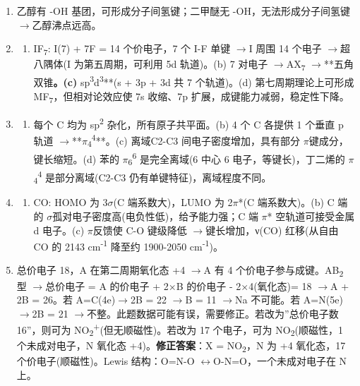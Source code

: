 \documentclass[a4paper,11pt]{ctexart}
\providecommand{\tightlist}{\setlength{\itemsep}{0pt}\setlength{\parskip}{0pt}}
\newcommand{\箭}{\ensuremath{\rightarrow}}
\newcommand{\左箭}{\ensuremath{\leftarrow}}
\newcommand{\上箭}{\ensuremath{\uparrow}}
\newcommand{\下箭}{\ensuremath{\downarrow}}
\newcommand{\衡}{\ensuremath{\rightleftharpoons}}
\newcommand{\双箭}{\ensuremath{\leftrightarrow}}
\newcommand{\约等于}{\ensuremath{\approx}}
\newcommand{\小于等于}{\ensuremath{\leq}}
\newcommand{\大于等于}{\ensuremath{\geq}}
\newcommand{\不等于}{\ensuremath{\neq}}
\newcommand{\西格马}{\ensuremath{\sigma}}
\newcommand{\派}{\ensuremath{\pi}}
\begin{document}
\begin{enumerate}
\begin{enumerate}
  \def\labelenumii{(\alph{enumii})}
  \tightlist
  \item
    HF 有氢键，HCl 无氢键 \箭 HF 沸点反常高。(b) 冰中每个水分子通过氢键与 4 个相邻水分子形成四面体排列，体积膨胀 \箭 密度小于液态水。
  \end{enumerate}
\item
  乙醇有 -OH 基团，可形成分子间氢键；二甲醚无 -OH，无法形成分子间氢键 \箭 乙醇沸点远高。
\item
  \begin{enumerate}
  \def\labelenumii{(\alph{enumii})}
  \tightlist
  \item
    IF\textsubscript{7}: I(7) + 7F = 14 个价电子，7 个 I-F 单键 \箭 I 周围 14 个电子 \箭 超八隅体(I 为第五周期，可利用 5d 轨道)。(b) 7 对电子 \箭 AX\textsubscript{7} \箭 **五角双锥\textbf{。(c) }sp\textsuperscript{3}d\textsuperscript{3}**(s + 3p + 3d 共 7 个轨道)。(d) 第七周期理论上可形成 MF\textsubscript{7}，但相对论效应使 7s 收缩、7p 扩展，成键能力减弱，稳定性下降。
  \end{enumerate}
\item
  \begin{enumerate}
  \def\labelenumii{(\alph{enumii})}
  \tightlist
  \item
    每个 C 均为 sp\textsuperscript{2} 杂化，所有原子共平面。(b) 4 个 C 各提供 1 个垂直 p 轨道 \箭 **\派\textsubscript{4}\textsuperscript{4}**。(c) 离域 C2-C3 间电子密度增加，具有部分 \派 键成分，键长缩短。(d) 苯的 \派\textsubscript{6}\textsuperscript{6} 是完全离域(6 中心 6 电子，等键长)，丁二烯的 \派\textsubscript{4}\textsuperscript{4} 是部分离域(C2-C3 仍有单键特征)，离域程度不同。
  \end{enumerate}
\item
  \begin{enumerate}
  \def\labelenumii{(\alph{enumii})}
  \tightlist
  \item
    CO: HOMO 为 3\西格马(C 端系数大)，LUMO 为 2\派*(C 端系数大)。(b) C 端的 \西格马 孤对电子密度高(电负性低)，给予能力强；C 端 \派* 空轨道可接受金属 d 电子。(c) \派 反馈使 C-O 键级降低 \箭 键长增加，ν(CO) 红移(从自由 CO 的 2143 cm\textsuperscript{-1} 降至约 1900-2050 cm\textsuperscript{-1})。
  \end{enumerate}
\item
  总价电子 18，A 在第二周期氧化态 +4 \箭 A 有 4 个价电子参与成键。AB\textsubscript{2} 型 \箭 总价电子 = A 的价电子 + 2×B 的价电子 - 2×4(氧化态)= 18 \箭 A + 2B = 26。若 A=C(4e)\箭 2B = 22 \箭 B = 11 \箭 Na 不可能。若 A=N(5e)\箭 2B = 21 \箭 不整。此题数据可能有误，需要修正。若改为''总价电子数 16''，则可为 NO\textsubscript{2}\textsuperscript{+}(但无顺磁性)。若改为 17 个电子，可为 NO\textsubscript{2}(顺磁性，1 个未成对电子，N 氧化态 +4)。\textbf{修正答案}：X = NO\textsubscript{2}，N 为 +4 氧化态，17 个价电子(顺磁性)。Lewis 结构：O=N-O \双箭 O-N=O，一个未成对电子在 N 上。

\end{enumerate}
\end{document}
